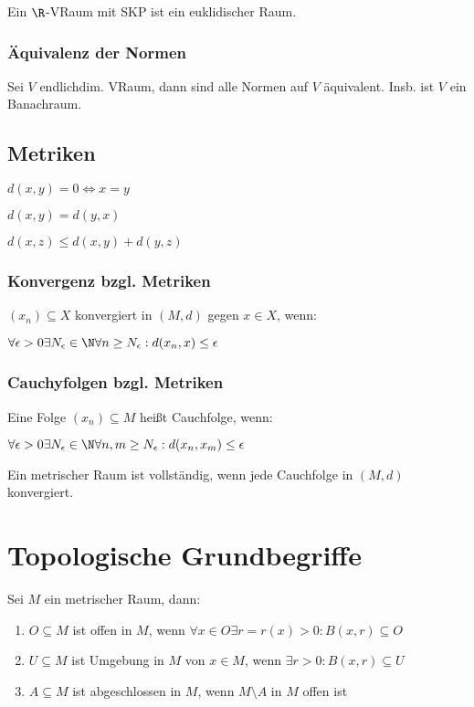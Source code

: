Ein $\R$-VRaum mit SKP ist ein euklidischer Raum.

\subsubsection*{Äquivalenz der Normen}

Sei $V$ endlichdim. VRaum, dann sind alle Normen auf $V$ äquivalent. Insb. ist $V$ ein Banachraum.

\subsection*{Metriken}

\begin{description}[leftmargin=!,labelwidth=35mm]
	\item[Definitheit] $d(x, y) = 0 \Leftrightarrow x = y$
	\item[Symmetrie] $d(x, y) = d(y, x)$
	\item[Dreiecksungleichung] $d(x, z) \leq d(x, y) + d(y, z)$
\end{description}

\subsubsection*{Konvergenz bzgl. Metriken}

$(x_n) \subseteq X$ konvergiert in $(M, d)$ gegen $x \in X$, wenn:

$\forall \epsilon > 0 \exists N_\epsilon \in \N \forall n \geq N_\epsilon : d(x_n, x) \leq \epsilon$

\subsubsection*{Cauchyfolgen bzgl. Metriken}

Eine Folge $(x_n) \subseteq M$ heißt Cauchfolge, wenn:

$\forall \epsilon > 0 \exists N_\epsilon \in \N \forall n, m \geq N_\epsilon : d(x_n, x_m) \leq \epsilon$

Ein metrischer Raum ist vollständig, wenn jede Cauchfolge in $(M, d)$ konvergiert.

\section*{Topologische Grundbegriffe}

Sei $M$ ein metrischer Raum, dann:

\begin{enumerate}[label=(\alph*)]
	\item $O \subseteq M$ ist offen in $M$, wenn $\forall x \in O \exists r = r(x) > 0 : B(x, r) \subseteq O$
	\item $U \subseteq M$ ist Umgebung in $M$ von $x \in M$, wenn $\exists r > 0 : B(x, r) \subseteq U$
	\item $A \subseteq M$ ist abgeschlossen in $M$, wenn $M\setminus A$ in $M$ offen ist
\end{enumerate}

